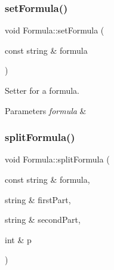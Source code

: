 \subsubsection{\texorpdfstring{set\+Formula()}{setFormula()}}
{\footnotesize\ttfamily void Formula\+::set\+Formula (\begin{DoxyParamCaption}\item[{const string \&}]{formula }\end{DoxyParamCaption})}

Setter for a formula. 
\begin{DoxyParams}{Parameters}
{\em formula} & \\
\hline
\end{DoxyParams}
\mbox{\label{class_formula_ae9390fbc99e5ade644589b144c73bfb7}} 
\subsubsection{\texorpdfstring{split\+Formula()}{splitFormula()}}
{\footnotesize\ttfamily void Formula\+::split\+Formula (\begin{DoxyParamCaption}\item[{const string \&}]{formula,  }\item[{string \&}]{first\+Part,  }\item[{string \&}]{second\+Part,  }\item[{int \&}]{p }\end{DoxyParamCaption})\hspace{0.3cm}{\ttfamily [private]}}

